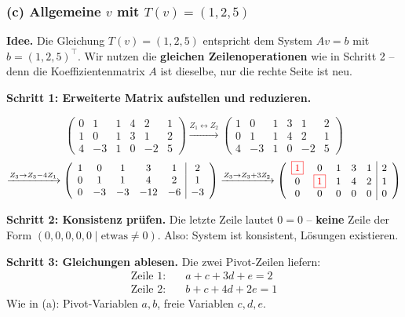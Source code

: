 \documentclass[a4paper,12pt]{article}
\newcommand{\piv}[1]{{\color{red}\boxed{#1}}}
\begin{document}
\subsubsection*{(c) Allgemeine $v$ mit $T(v) = (1, 2, 5)$}

\textbf{Idee.} Die Gleichung $T(v) = (1, 2, 5)$ entspricht dem System $Av = b$ mit $b = (1, 2, 5)^\top$. Wir nutzen die \textbf{gleichen Zeilenoperationen} wie in Schritt 2 -- denn die Koeffizientenmatrix $A$ ist dieselbe, nur die rechte Seite ist neu.

\textbf{Schritt 1: Erweiterte Matrix aufstellen und reduzieren.}

\[
\left(\begin{array}{ccccc|c}
0 & 1 & 1 & 4 & 2 & 1 \\
1 & 0 & 1 & 3 & 1 & 2 \\
4 & -3 & 1 & 0 & -2 & 5
\end{array}\right)
\xrightarrow{Z_1 \leftrightarrow Z_2}
\left(\begin{array}{ccccc|c}
1 & 0 & 1 & 3 & 1 & 2 \\
0 & 1 & 1 & 4 & 2 & 1 \\
4 & -3 & 1 & 0 & -2 & 5
\end{array}\right)
\]
\[
\xrightarrow{Z_3 \to Z_3 - 4 Z_1}
\left(\begin{array}{ccccc|c}
1 & 0 & 1 & 3 & 1 & 2 \\
0 & 1 & 1 & 4 & 2 & 1 \\
0 & -3 & -3 & -12 & -6 & -3
\end{array}\right)
\xrightarrow{Z_3 \to Z_3 + 3 Z_2}
\left(\begin{array}{ccccc|c}
\piv{1} & 0 & 1 & 3 & 1 & 2 \\
0 & \piv{1} & 1 & 4 & 2 & 1 \\
0 & 0 & 0 & 0 & 0 & 0
\end{array}\right)
\]

\textbf{Schritt 2: Konsistenz pr\"ufen.} Die letzte Zeile lautet $0 = 0$ -- \textbf{keine} Zeile der Form $(0, 0, 0, 0, 0 \mid \text{etwas} \neq 0)$. Also: System ist konsistent, L\"osungen existieren.

\textbf{Schritt 3: Gleichungen ablesen.} Die zwei Pivot-Zeilen liefern:
\begin{align*}
\text{Zeile 1:} &\quad a + c + 3d + e = 2 \\
\text{Zeile 2:} &\quad b + c + 4d + 2e = 1
\end{align*}
Wie in (a): Pivot-Variablen $a, b$, freie Variablen $c, d, e$.
\end{document}
